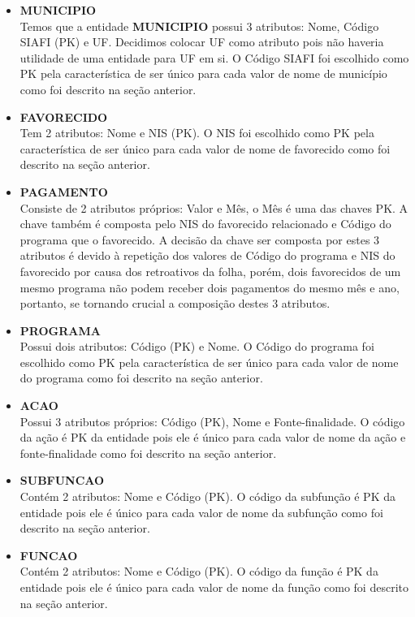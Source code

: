 \documentclass[12pt]{article}
\begin{document}
	\begin{itemize}
		\item \textbf{MUNICIPIO} \\ Temos que a entidade \textbf{MUNICIPIO} possui 3 atributos: Nome, Código SIAFI (PK) e UF. Decidimos colocar UF como atributo pois não haveria utilidade de uma entidade para UF em si. O Código SIAFI foi escolhido como PK pela característica de ser único para cada valor de nome de município como foi descrito na seção anterior. 
		\item \textbf{FAVORECIDO} \\ Tem 2 atributos: Nome e NIS (PK). O NIS foi escolhido como PK pela característica de ser único para cada valor de nome de favorecido como foi descrito na seção anterior. 
		\item \textbf{PAGAMENTO} \\ Consiste de 2 atributos próprios: Valor e Mês, o Mês é uma das chaves PK. A chave também é composta pelo NIS do favorecido relacionado e Código do programa que o favorecido. A decisão da chave ser composta por estes 3 atributos é devido à repetição dos valores de Código do programa e NIS do favorecido por causa dos retroativos da folha, porém, dois favorecidos de um mesmo programa não podem receber dois pagamentos do mesmo mês e ano, portanto, se tornando crucial a composição destes 3 atributos.
		\item \textbf{PROGRAMA} \\ Possui dois atributos: Código (PK) e Nome. O Código do programa foi escolhido como PK pela característica de ser único para cada valor de nome do programa como foi descrito na seção anterior. 
		\item \textbf{ACAO} \\ Possui 3 atributos próprios: Código (PK), Nome e Fonte-finalidade. O código da ação é PK da entidade pois ele é único para cada valor de nome da ação e fonte-finalidade como foi descrito na seção anterior.  
		\item \textbf{SUBFUNCAO} \\ Contém 2 atributos: Nome e Código (PK). O código da subfunção é PK da entidade pois ele é único para cada valor de nome da subfunção como foi descrito na seção anterior.
		\item \textbf{FUNCAO} \\ Contém 2 atributos: Nome e Código (PK). O código da função é PK da entidade pois ele é único para cada valor de nome da função como foi descrito na seção anterior.
	\end{itemize}
\end{document}
